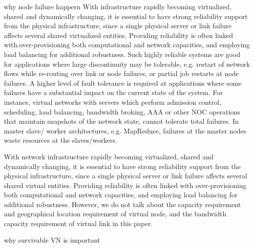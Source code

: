 why node failure happern
With infrastructure rapidly becoming virtualized, shared and dynamically changing, it is essential to have strong reliability support from the physical infrastructure, since a single physical server or link failure affects several shared virtualized entities. Providing reliability is often linked with.over-provisioning both computational and network capacities, and employing load balancing for additional robustness. Such highly reliable systems are good for applications where large discontinuity may be tolerable, e.g. restart of network flows while re-routing over link or node failures, or partial job restarts at node failures. A higher level of fault tolerance is required at applications where some failures have a substantial impact on the current state of the system. For instance, virtual networks with servers which perform admission control, scheduling, load balancing, bandwidth broking, AAA or other NOC operations that maintain snapshots of the network state, cannot tolerate total failures. In master slave/ worker architectures, e.g. MapReduce, failures at the master nodes waste resources at the slaves/workers.

With network infrastructure rapidly becoming  virtualized, shared and dynamically changing, it is essential to have strong reliability support from the physical infrastructure, since a single physical server or link failure affects several shared virtual entities. Providing reliability is often linked with over-provisioning both computational and network capacities, and employing load balancing for additional robustness. However, we do not talk about the capacity requirement and geographical location requirement of virtual node, and the bandwidth capacity requirement of virtual link in this paper.


why survivable VN is important

